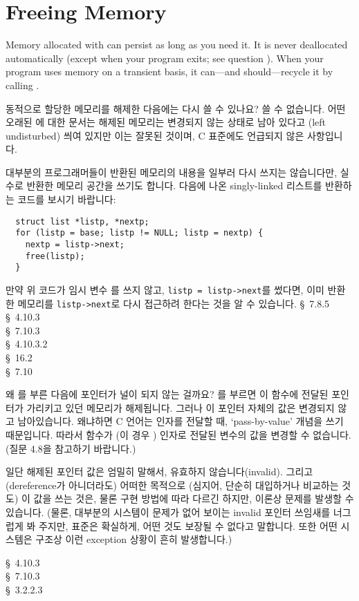 \section{Freeing Memory}
Memory allocated  with  can persist as long as you need it.
It is never deallocated automatically (except when your program exits; see
question ).  When your program uses memory on a transient basis, it
can---and should---recycle it by calling .

\begin{faq}
	동적으로 할당한 메모리를 해제한 다음에는 다시 쓸 수 있나요?
\A
	쓸 수 없습니다.  어떤 오래된 에 대한 문서는
	해제된 메모리는
	변경되지 않는 상태로 남아 있다고 (left undisturbed) 씌여 있지만
	이는 잘못된 것이며, C 표준에도 언급되지 않은 사항입니다.

	대부분의 프로그래머들이 반환된 메모리의 내용을 일부러 다시 쓰지는
	않습니다만, 실수로 반환한 메모리 공간을 쓰기도 합니다.
        다음에 나온 singly-linked 리스트를 반환하는 코드를
	보시기 바랍니다:

\begin{verbatim}
  struct list *listp, *nextp;
  for (listp = base; listp != NULL; listp = nextp) {
    nextp = listp->next;
    free(listp);
  }
\end{verbatim}
	\noindent 만약 위 코드가 임시 변수 를 쓰지 않고,
        \verb+listp = listp->next+를 썼다면, 이미 반환한 메모리를
        \verb+listp->next+로 다시 접근하려 한다는 것을 알 수 있습니다.
\R
	\cite{kr2} \S\ 7.8.5  \\
        \cite{ansi} \S\ 4.10.3 \\
	\cite{c89} \S\ 7.10.3 \\
	\cite{rationale} \S\ 4.10.3.2 \\
	\cite{hs} \S\ 16.2  \\
	\cite{ctp} \S\ 7.10 
\end{faq}

\begin{faq}
	왜 를 부른 다음에 포인터가 널이 되지 않는
	걸까요?
\A
	를 부르면 이 함수에 전달된 포인터가 가리키고 있던
	메모리가 해제됩니다.  그러나 이 포인터 자체의 값은 변경되지 않고
	남아있습니다.  왜냐하면 C 언어는 인자를 전달할 때, `pass-by-value'
	개념을 쓰기 때문입니다.  따라서 함수가 (이 경우 ) 인자로
	전달된 변수의 값을 변경할 수 없습니다.  (질문 4.8을 참고하기
	바랍니다.)

	일단 해제된 포인터 값은 엄밀히 말해서, 유효하지 않습니다(invalid).
	그리고 (dereference가 아니더라도) 어떠한 목적으로 (심지어,
        단순히 대입하거나 비교하는 것도) 이 값을 쓰는 것은,
	물론 구현 방법에 따라 다르긴 하지만, 이론상 문제를 발생할 수 있습니다.
        (물론, 대부분의 시스템이 문제가 없어 보이는
        invalid 포인터 쓰임새를 너그럽게 봐 주지만, 표준은 확실하게,
        어떤 것도 보장될 수 없다고 말합니다. 또한 어떤 시스템은 구조상 이런
        exception 상황이 흔히 발생합니다.)

\R
	\cite{ansi} \S\ 4.10.3 \\
	\cite{c89} \S\ 7.10.3 \\
	\cite{rationale} \S\ 3.2.2.3
\end{faq}

